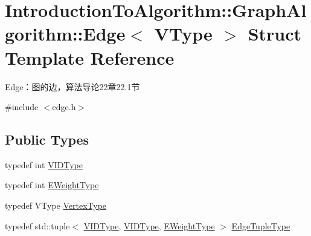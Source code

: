 \hypertarget{struct_introduction_to_algorithm_1_1_graph_algorithm_1_1_edge}{}\section{Introduction\+To\+Algorithm\+:\+:Graph\+Algorithm\+:\+:Edge$<$ V\+Type $>$ Struct Template Reference}
\label{struct_introduction_to_algorithm_1_1_graph_algorithm_1_1_edge}


Edge：图的边，算法导论22章22.1节  




{\ttfamily \#include $<$edge.\+h$>$}

\subsection*{Public Types}
\begin{DoxyCompactItemize}
\item 
typedef int \hyperlink{struct_introduction_to_algorithm_1_1_graph_algorithm_1_1_edge_a92b817240405b82f23dee4cdbefcb54f}{V\+I\+D\+Type}
\item 
typedef int \hyperlink{struct_introduction_to_algorithm_1_1_graph_algorithm_1_1_edge_a95cf631669c2a0d1bebb58ba2af110de}{E\+Weight\+Type}
\item 
typedef V\+Type \hyperlink{struct_introduction_to_algorithm_1_1_graph_algorithm_1_1_edge_a2a7bb332de66131ed664eb279c7ac1ed}{Vertex\+Type}
\item 
typedef std\+::tuple$<$ \hyperlink{struct_introduction_to_algorithm_1_1_graph_algorithm_1_1_edge_a92b817240405b82f23dee4cdbefcb54f}{V\+I\+D\+Type}, \hyperlink{struct_introduction_to_algorithm_1_1_graph_algorithm_1_1_edge_a92b817240405b82f23dee4cdbefcb54f}{V\+I\+D\+Type}, \hyperlink{struct_introduction_to_algorithm_1_1_graph_algorithm_1_1_edge_a95cf631669c2a0d1bebb58ba2af110de}{E\+Weight\+Type} $>$ \hyperlink{struct_introduction_to_algorithm_1_1_graph_algorithm_1_1_edge_a6cc12c05f7645ce74a6cff13b9ea932c}{Edge\+Tuple\+Type}
\end{DoxyCompactItemize}
